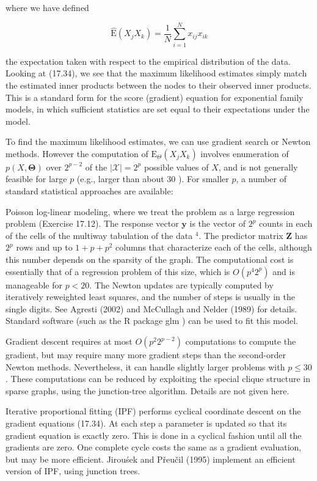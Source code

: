 \documentclass[10pt]{article}
\begin{document}
where we have defined


\begin{equation*}
\hat{\mathrm{E}}\left(X_{j} X_{k}\right)=\frac{1}{N} \sum_{i=1}^{N} x_{i j} x_{i k} \tag{17.35}
\end{equation*}


the expectation taken with respect to the empirical distribution of the data. Looking at (17.34), we see that the maximum likelihood estimates simply match the estimated inner products between the nodes to their observed inner products. This is a standard form for the score (gradient) equation for exponential family models, in which sufficient statistics are set equal to their expectations under the model.

To find the maximum likelihood estimates, we can use gradient search or Newton methods. However the computation of $\mathrm{E}_{\Theta}\left(X_{j} X_{k}\right)$ involves enumeration of $p(X, \boldsymbol{\Theta})$ over $2^{p-2}$ of the $|\mathcal{X}|=2^{p}$ possible values of $X$, and is not generally feasible for large $p$ (e.g., larger than about 30 ). For smaller $p$, a number of standard statistical approaches are available:

Poisson log-linear modeling, where we treat the problem as a large regression problem (Exercise 17.12). The response vector $\mathbf{y}$ is the vector of $2^{p}$ counts in each of the cells of the multiway tabulation of the data ${ }^{4}$. The predictor matrix $\mathbf{Z}$ has $2^{p}$ rows and up to $1+p+p^{2}$ columns that characterize each of the cells, although this number depends on the sparsity of the graph. The computational cost is essentially that of a regression problem of this size, which is $O\left(p^{4} 2^{p}\right)$ and is manageable for $p<20$. The Newton updates are typically computed by iteratively reweighted least squares, and the number of steps is usually in the single digits. See Agresti (2002) and McCullagh and Nelder (1989) for details. Standard software (such as the R package glm ) can be used to fit this model.

Gradient descent requires at most $O\left(p^{2} 2^{p-2}\right)$ computations to compute the gradient, but may require many more gradient steps than the second-order Newton methods. Nevertheless, it can handle slightly larger problems with $p \leq 30$. These computations can be reduced by exploiting the special clique structure in sparse graphs, using the junction-tree algorithm. Details are not given here.

Iterative proportional fitting (IPF) performs cyclical coordinate descent on the gradient equations (17.34). At each step a parameter is updated so that its gradient equation is exactly zero. This is done in a cyclical fashion until all the gradients are zero. One complete cycle costs the same as a gradient evaluation, but may be more efficient. Jirouśek and Přeučil (1995) implement an efficient version of IPF, using junction trees.
\end{document}
